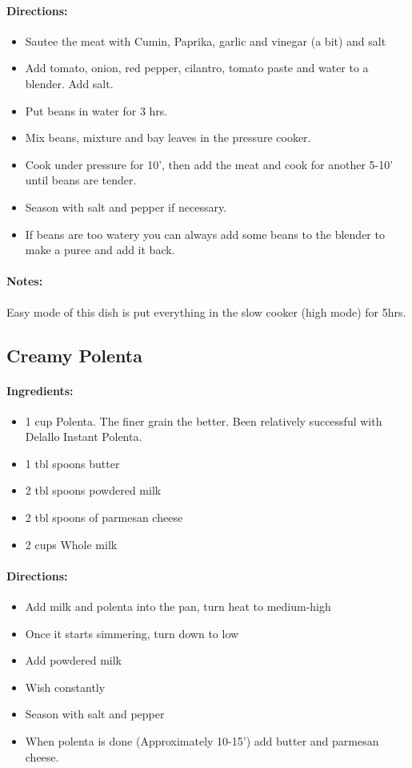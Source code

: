 \documentclass{article}
\begin{document}
\paragraph{Directions:}
\begin{itemize}
	\item Sautee the meat with Cumin, Paprika, garlic and vinegar (a bit) and salt
	\item Add tomato, onion, red pepper, cilantro, tomato paste and water to a blender. Add salt.
	\item Put beans in water for 3 hrs.
	\item Mix beans, mixture and bay leaves in the pressure cooker.
	\item Cook under pressure for 10', then add the meat and cook for another 5-10' until beans are tender.
	\item Season with salt and pepper if necessary.
	\item If beans are too watery you can always add some beans to the blender to make a puree and add it back.
\end{itemize}

\paragraph{Notes:}
Easy mode of this dish is put everything in the slow cooker (high mode) for 5hrs.

\subsection{Creamy Polenta}

\paragraph{Ingredients:}

\begin{itemize}
	\item 1 cup Polenta. The finer grain the better. Been relatively successful with Delallo Instant Polenta.
	\item 1 tbl spoons butter
	\item 2 tbl spoons powdered milk
	\item 2 tbl spoons of parmesan cheese
	\item 2 cups Whole milk
\end{itemize}

\paragraph{Directions:}
\begin{itemize}
	\item Add milk and polenta into the pan, turn heat to medium-high
	\item Once it starts simmering, turn down to low
	\item Add powdered milk
	\item Wish constantly
	\item Season with salt and pepper
	\item When polenta is done (Approximately 10-15’) add butter and parmesan cheese.
\end{itemize}
\end{document}

